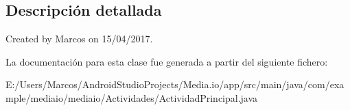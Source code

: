 \subsection{Descripción detallada}
Created by Marcos on 15/04/2017. 

La documentación para esta clase fue generada a partir del siguiente fichero\+:\begin{DoxyCompactItemize}
\item 
E\+:/\+Users/\+Marcos/\+Android\+Studio\+Projects/\+Media.\+io/app/src/main/java/com/example/mediaio/mediaio/\+Actividades/Actividad\+Principal.\+java\end{DoxyCompactItemize}
